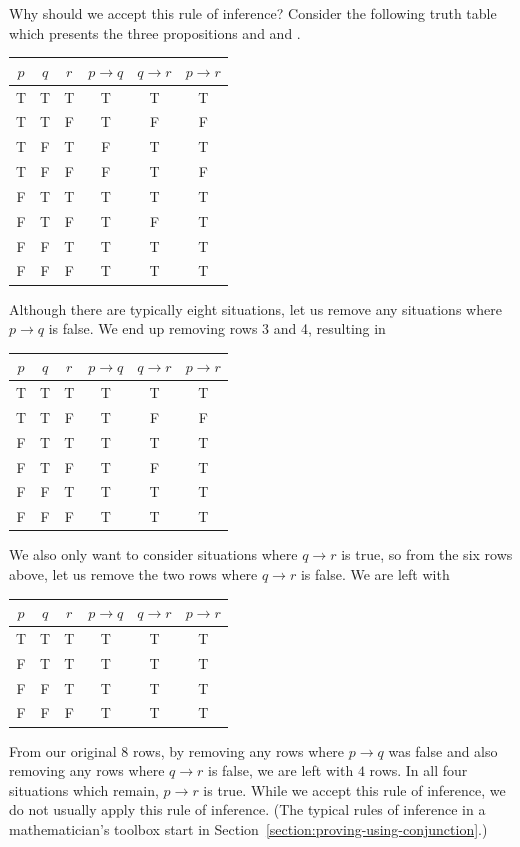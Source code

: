 \documentclass{book}
\theoremstyle{ekimcustom}
\begin{document}
Why should we accept this rule of inference? Consider the following truth table which presents the three propositions  and   and .
\begin{center}
\begin{tabular}{c|c|c||c|c|c}
$p$ & $q$ & $r$ & $p \to q$ & $q \to r$ & $p \to r$ \\\hline
T & T & T & T& T & T \\
T & T & F & T& F& F\\
T & F & T & F& T& T \\
T & F & F & F& T& F\\
F & T & T & T& T& T\\
F & T & F & T& F& T\\
F & F & T & T& T & T\\
F & F & F & T & T& T
\end{tabular}
\end{center}
Although there are typically eight situations, let us remove any situations where $p \to q$ is false. We end up removing rows 3 and 4, resulting in
\begin{center}
\begin{tabular}{c|c|c||c|c|c}
$p$ & $q$ & $r$ & $p \to q$ & $q \to r$ & $p \to r$ \\\hline
T & T & T & T& T & T \\
T & T & F & T& F& F\\
F & T & T & T& T& T\\
F & T & F & T& F& T\\
F & F & T & T& T & T\\
F & F & F & T & T& T
\end{tabular}
\end{center}
We also only want to consider situations where $q \rightarrow r$ is true, so from the six rows above, let us remove the two rows where $q \to r$ is false. We are left with
\begin{center}
\begin{tabular}{c|c|c||c|c|c}
$p$ & $q$ & $r$ & $p \to q$ & $q \to r$ & $p \to r$ \\\hline
T & T & T & T& T & T \\
F & T & T & T& T& T\\
F & F & T & T& T & T\\
F & F & F & T & T& T
\end{tabular}
\end{center}
From our original $8$ rows, by removing any rows where $p \to q$ was false and also removing any rows where $q \to r$ is false, we are left with $4$ rows. In all four situations which remain, $p \to r$ is true. While we accept this rule of inference, we do not usually apply this rule of inference. (The typical rules of inference in a mathematician's toolbox start in Section~\ref{section:proving-using-conjunction}.)
\end{document}
